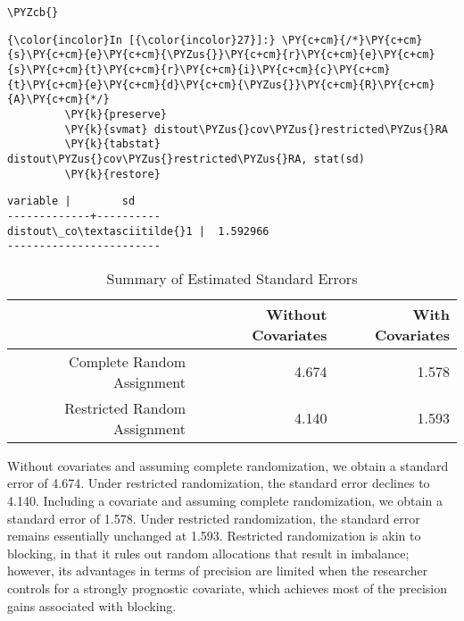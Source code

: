 \documentclass[11pt,notitlepage]{article}\usepackage[]{graphicx}\usepackage[]{color}
\makeatletter
\newenvironment{kframe}{%
 \def\at@end@of@kframe{}%
 \ifinner\ifhmode%
  \def\at@end@of@kframe{\end{minipage}}%
  \begin{minipage}{\columnwidth}%
 \fi\fi%
 \def\FrameCommand##1{\hskip\@totalleftmargin \hskip-\fboxsep
 \colorbox{shadecolor}{##1}\hskip-\fboxsep
     \hskip-\linewidth \hskip-\@totalleftmargin \hskip\columnwidth}%
 \MakeFramed {\advance\hsize-\width
   \@totalleftmargin\z@ \linewidth\hsize
   \@setminipage}}%
 {\par\unskip\endMakeFramed%
 \at@end@of@kframe}
\newenvironment{knitrout}{}{} %
\makeatother
\begin{document}
\begin{enumerate}[a)]
\begin{knitrout}
\begin{kframe}
\begin{Verbatim}[commandchars=\\\{\}]
         \PYZcb{}
\end{Verbatim}

    \begin{Verbatim}[commandchars=\\\{\}]
{\color{incolor}In [{\color{incolor}27}]:} \PY{c+cm}{/*}\PY{c+cm}{s}\PY{c+cm}{e}\PY{c+cm}{\PYZus{}}\PY{c+cm}{r}\PY{c+cm}{e}\PY{c+cm}{s}\PY{c+cm}{t}\PY{c+cm}{r}\PY{c+cm}{i}\PY{c+cm}{c}\PY{c+cm}{t}\PY{c+cm}{e}\PY{c+cm}{d}\PY{c+cm}{\PYZus{}}\PY{c+cm}{R}\PY{c+cm}{A}\PY{c+cm}{*/}
         \PY{k}{preserve}
         \PY{k}{svmat} distout\PYZus{}cov\PYZus{}restricted\PYZus{}RA 
         \PY{k}{tabstat} distout\PYZus{}cov\PYZus{}restricted\PYZus{}RA, stat(sd)
         \PY{k}{restore}
\end{Verbatim}

    \begin{Verbatim}[commandchars=\\\{\}]
    variable |        sd
-------------+----------
distout\_co\textasciitilde{}1 |  1.592966
------------------------
    \end{Verbatim}
\end{kframe}
\end{knitrout}

\begin{table}[H]
\centering
\caption{Summary of Estimated Standard Errors} 
\begin{tabular}{rrr}
  \hline
 & Without Covariates & With Covariates \\ 
  \hline
Complete Random Assignment & 4.674 & 1.578 \\ 
  Restricted Random Assignment & 4.140 & 1.593 \\ 
   \hline
\end{tabular}
\end{table}


Without covariates and assuming complete randomization, we obtain a standard error of 4.674. Under restricted randomization, the standard error declines to 4.140.  Including a covariate and assuming complete randomization, we obtain a standard error of 1.578.  Under restricted randomization, the standard error remains essentially unchanged at 1.593. Restricted randomization is akin to blocking, in that it rules out random allocations that result in imbalance; however, its advantages in terms of precision are limited when the researcher controls for a strongly prognostic covariate, which achieves most of the precision gains associated with blocking. 

\end{enumerate}
\end{document}
